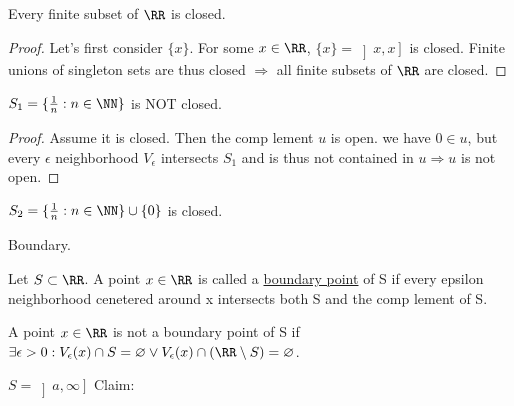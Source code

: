 \documentclass[class=scrartcl, crop=false]{standalone}
\begin{document}
\begin{example}
  Every finite subset of $\RR$ is closed.
  \begin{proof}
    Let's first consider $\{x\}$. For some $x \in \RR$, $\{x\} = \left]x, x\right]$ is closed.
    Finite unions of singleton sets are thus closed $\Rightarrow$ all finite subsets of $\RR$ are closed.
  \end{proof}
\end{example}
\begin{example}
  $S_1 = \{\frac{1}{n}: n \in \NN\}$ is NOT closed.
  \begin{proof}
    Assume it is closed. Then the comp lement $u$ is open. we have $0 \in u$, but every $\epsilon$ neighborhood $V_\epsilon$ intersects $S_1$ and is thus not contained in $u \Rightarrow u$ is not open.
  \end{proof}
\end{example}
\begin{example}
  $S_2 = \{\frac{1}{n}: n \in \NN\} \cup \{0\}$ is closed.
\end{example}

\begin{definition}
  Boundary.

  Let $S \subset \RR$. A point $x \in \RR$ is called a \ul{boundary point} of S if every epsilon neighborhood cenetered around x intersects both S and the comp lement of S.

  A point $x \in \RR$ is not a boundary point of S if $\exists \epsilon > 0: V_\epsilon(x) \cap S = \varnothing \vee V_\epsilon(x) \cap (\RR \setminus S) = \varnothing$.
\end{definition}

\begin{example}
  $S = \left]a, \infty\right]$ 
  Claim: 
\end{example}
\end{document}
